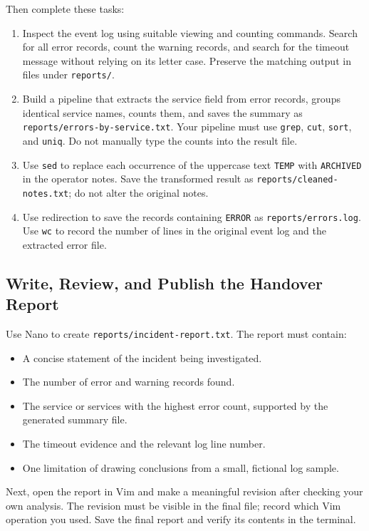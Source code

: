 Then complete these tasks:
\begin{enumerate}
    \item Inspect the event log using suitable viewing and counting commands. Search for all error records, count the warning records, and search for the timeout message without relying on its letter case. Preserve the matching output in files under \texttt{reports/}.
    \item Build a pipeline that extracts the service field from error records, groups identical service names, counts them, and saves the summary as \texttt{reports/errors-by-service.txt}. Your pipeline must use \texttt{grep}, \texttt{cut}, \texttt{sort}, and \texttt{uniq}. Do not manually type the counts into the result file.
    \item Use \texttt{sed} to replace each occurrence of the uppercase text \texttt{TEMP} with \texttt{ARCHIVED} in the operator notes. Save the transformed result as \texttt{reports/cleaned-notes.txt}; do not alter the original notes.
    \item Use redirection to save the records containing \texttt{ERROR} as \texttt{reports/errors.log}. Use \texttt{wc} to record the number of lines in the original event log and the extracted error file.
\end{enumerate}

\subsection{Write, Review, and Publish the Handover Report}

Use Nano to create \texttt{reports/incident-report.txt}. The report must contain:
\begin{itemize}
    \item A concise statement of the incident being investigated.
    \item The number of error and warning records found.
    \item The service or services with the highest error count, supported by the generated summary file.
    \item The timeout evidence and the relevant log line number.
    \item One limitation of drawing conclusions from a small, fictional log sample.
\end{itemize}

Next, open the report in Vim and make a meaningful revision after checking your own analysis. The revision must be visible in the final file; record which Vim operation you used. Save the final report and verify its contents in the terminal.

